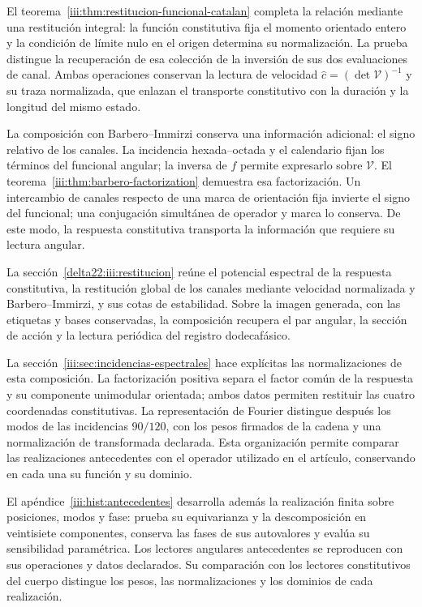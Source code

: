 El teorema~\ref{iii:thm:restitucion-funcional-catalan} completa la
relación mediante una restitución integral: la función constitutiva
fija el momento orientado entero y la condición de límite nulo en el
origen determina su normalización. La prueba distingue la recuperación
de esa colección de la inversión de sus dos evaluaciones de canal.
Ambas operaciones conservan la lectura de velocidad
$\widehat c=(\det\mathcal V)^{-1}$ y su traza normalizada, que enlazan
el transporte constitutivo con la duración y la longitud del mismo estado.

La composición con Barbero--Immirzi conserva una información adicional:
el signo relativo de los canales. La incidencia hexada--octada y el
calendario fijan los términos del funcional angular; la inversa de
$f$ permite expresarlo sobre $\mathcal V$. El
teorema~\ref{iii:thm:barbero-factorization} demuestra esa
factorización. Un intercambio de canales respecto de una marca de
orientación fija invierte el signo del funcional; una conjugación
simultánea de operador y marca lo conserva. De este modo, la respuesta
constitutiva transporta la información que requiere su lectura angular.

\par
La sección~\ref{delta22:iii:restitucion} reúne el potencial espectral de la respuesta constitutiva, la restitución global de los canales mediante velocidad normalizada y Barbero--Immirzi, y sus cotas de estabilidad. Sobre la imagen generada, con las etiquetas y bases conservadas, la composición recupera el par angular, la sección de acción y la lectura periódica del registro dodecafásico.

La sección~\ref{iii:sec:incidencias-espectrales} hace explícitas las
normalizaciones de esta composición. La factorización positiva separa
el factor común de la respuesta y su componente unimodular orientada;
ambos datos permiten restituir las cuatro coordenadas constitutivas.
La representación de Fourier distingue después los modos de las
incidencias $90/120$, con los pesos firmados de la cadena y una
normalización de transformada declarada. Esta organización permite
comparar las realizaciones antecedentes con el operador utilizado
en el artículo, conservando en cada una su función y su dominio.

El apéndice~\ref{iii:hist:antecedentes} desarrolla además la realización
finita sobre posiciones, modos y fase: prueba su equivarianza y la
descomposición en veintisiete componentes, conserva las fases de sus
autovalores y evalúa su sensibilidad paramétrica. Los lectores angulares
antecedentes se reproducen con sus operaciones y datos declarados.
Su comparación con los lectores constitutivos del cuerpo distingue los
pesos, las normalizaciones y los dominios de cada realización.

